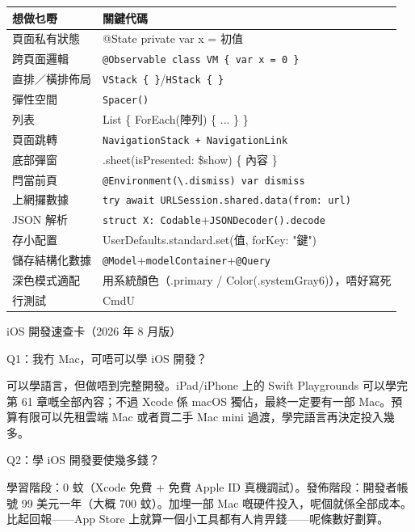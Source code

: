 


\begin{center}
\begin{tabularx}{\linewidth}{|X|X|}
\hline
\textbf{想做乜嘢} & \textbf{關鍵代碼} \tabularnewline
\hline
頁面私有狀態 & @State private var x = 初值 \tabularnewline
跨頁面邏輯 & \texttt{@Observable class VM \{ var x = 0 \}} \tabularnewline
直排／橫排佈局 & \texttt{VStack \{ \}}/\texttt{HStack \{ \}} \tabularnewline
彈性空間 & \texttt{Spacer()} \tabularnewline
列表 & List \{ ForEach(陣列) \{ ... \} \} \tabularnewline
頁面跳轉 & \texttt{NavigationStack + NavigationLink} \tabularnewline
底部彈窗 & .sheet(isPresented: \$show) \{ 內容 \} \tabularnewline
閂當前頁 & \texttt{@Environment(\textbackslash{}.\allowbreak dismiss) var dismiss} \tabularnewline
上網攞數據 & \texttt{try await URLSession.\allowbreak shared.\allowbreak data(from: url)} \tabularnewline
JSON 解析 & \texttt{struct X: Codable}+\texttt{JSONDecoder().\allowbreak decode} \tabularnewline
存小配置 & UserDefaults.standard.set(值, forKey: "鍵") \tabularnewline
儲存結構化數據 & \texttt{@Model}+\texttt{modelContainer}+\texttt{@Query} \tabularnewline
深色模式適配 & 用系統顏色（.primary / Color(.systemGray6)），唔好寫死 \tabularnewline
行測試 & CmdU \tabularnewline
\hline
\end{tabularx}
\end{center}

\begin{center}\small\color{gray}iOS 開發速查卡（2026 年 8 月版）\end{center}


Q1：我冇 Mac，可唔可以學 iOS 開發？

可以學語言，但做唔到完整開發。iPad/iPhone 上的 Swift Playgrounds 可以學完第 61 章嘅全部內容；不過 Xcode 係 macOS 獨佔，最終一定要有一部 Mac。預算有限可以先租雲端 Mac 或者買二手 Mac mini 過渡，學完語言再決定投入幾多。

Q2：學 iOS 開發要使幾多錢？

學習階段：0 蚊（Xcode 免費 + 免費 Apple ID 真機調試）。發佈階段：開發者帳號 99 美元一年（大概 700 蚊）。加埋一部 Mac 嘅硬件投入，呢個就係全部成本。比起回報——App Store 上就算一個小工具都有人肯畀錢——呢條數好劃算。


